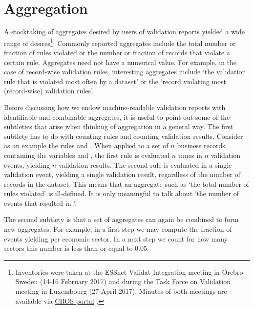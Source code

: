 \section{Aggregation}
\label{sect:aggregation}
A stocktaking of aggregates desired by users of validation reports
yielded a wide range of desires\footnote{Inventories were taken at 
the ESSnet Validat Integration meeting in \"Orebro Sweden (14-16 February 2017) and during
the Task Force on Validation meeting in Luxembourg (27 April 2017). Minutes of both
meetings are available via \href{https://ec.europa.eu/eurostat/cros}{CROS-portal} .}.
Commonly reported aggregates include the total number or fraction of rules
violated or the number or fraction of records  that violate a certain rule.
Aggregates need not have a numerical value. For example, in the case of
record-wise validation rules, interesting aggregates include `the validation
rule that is violated most often by a dataset' or the `record violating most
(record-wise) validation rules'. 

Before discussing how we endow machine-readable validation reports with
identifiable and combinable aggregates, it is useful to point out some of the
subtleties that arise when thinking of aggregation in a general way. The first
subtlety has to do with counting rules and counting validation results.
Consider as an example the rules  and .  When applied to a set of $n$ business records containing the variables
 and , the first rule is evaluated $n$ times in $n$
validation events, yielding $n$ validation results. The second rule is
evaluated in a single validation event, yielding a single validation result,
regardless of the number of records in the dataset. This means that an
aggregate such as `the total number of rules violated' is ill-defined. It is
only meaningful to talk about `the number of events that resulted in
\onwaar{}'. 

The second subtlety is that a set of aggregates can again be combined to form
new aggregates. For example, in a first step we may compute the fraction of
events yielding \onwaar{} per economic sector. In a next step we count for how
many sectors this number is less than or equal to 0.05.

